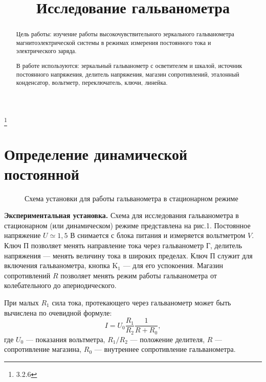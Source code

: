 


\title{Исследование гальванометра}
\thanks{3.2.6}



\begin{abstract}
Цель работы: изучение работы высокочувствительного зеркального гальванометра магнитоэлектрической системы в режимах измерения постоянного тока и электрического заряда.

В работе используются: зеркальный гальванометр с осветителем и шкалой, источник постоянного напряжения, делитель напряжения, магазин сопротивлений, эталонный конденсатор, вольтметр, переключатель, ключи, линейка.\\

\end{abstract}

\maketitle


\section{\label{sec:level1}Определение динамической постоянной}

\begin{figure}[h]
\caption{Схема установки для работы гальванометра в стационарном режиме}
\end{figure}

\textbf{Экспериментальная установка.} Схема для исследования гальванометра в стационарном (или динамическом) режиме представлена на рис.1. Постоянное напряжение $U \simeq 1,5$ В снимается с блока питания и измеряется вольтметром $V$. Ключ П позволяет менять направление тока через гальванометр Г, делитель напряжения — менять величину тока в широких пределах. Ключ П служит для включения гальванометра, кнопка $\text{K}_1$ — для его успокоения. Магазин сопротивлений $R$ позволяет менять режим работы гальванометра от колебательного до апериодического.

При малых $R_1$ сила тока, протекающего через гальванометр может быть вычислена по очевидной формуле:
\begin{equation}
    I = U_0 \frac{R_1}{R_2}\frac{1}{R+R_0},
\end{equation}
где $U_0$ — показания вольтметра, $R_1 / R_2$ — положение делителя, $R$ — сопротивление магазина, $R_0$ — внутреннее сопротивление гальванометра.

